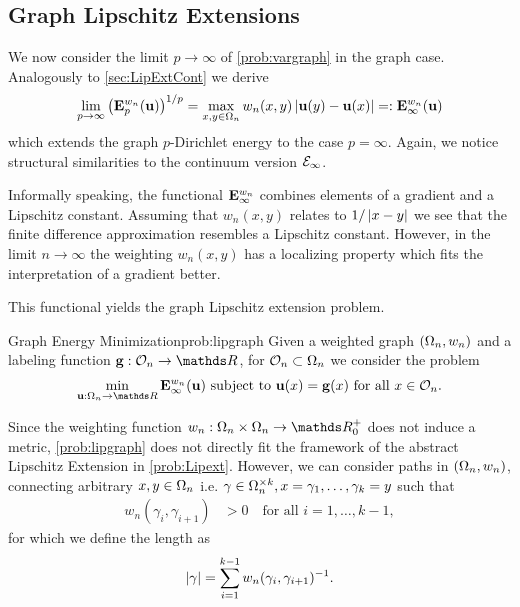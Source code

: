 \subsection{Graph Lipschitz Extensions}\label{sec:GLipExt}
%
We now consider the limit $p\to\infty$ of \cref{prob:vargraph} in the graph case. Analogously to \cref{sec:LipExtCont} we derive
%
\begin{align*}
\lim_{p\to\infty} \left(\mathbf{E}^{w_n}_p(\mathbf{u})\right)^{1/p}= \max_{x,y\in\Omega_n} w_n(x,y) \left|\mathbf{u}(y) - \mathbf{u}(x)\right|=:\mathbf{E}^{w_n}_\infty(\mathbf{u})
\end{align*}
%
which extends the graph $p$-Dirichlet energy to the case $p=\infty$. Again, we notice structural similarities to 
the continuum version $\mathcal{E}_\infty$. 
%
\begin{remark}{}{}
Informally speaking, the functional $\mathbf{E}^{w_n}_\infty$ combines elements of a gradient and a Lipschitz constant. Assuming that $w_n(x,y)$ relates to $1/\left|x-y\right|$ we see that the finite difference approximation
resembles a Lipschitz constant. However, in the limit $n\to\infty$ the weighting $w_n(x,y)$ has a localizing property which fits the interpretation of a gradient better.
\end{remark}
%
\noindent%
This functional yields the graph Lipschitz extension problem.
%
\begin{problem}{Graph Energy Minimization}{prob:lipgraph}
Given a weighted graph $(\Omega_n, w_n)$ and a labeling function $\vec g:\conset_n\to\R$, for $\mathcal{O}_n\subset\Omega_n$ we consider 
the problem
%
\begin{align*}
\min_{\vec u:\domain_n\to\R} \GE_\infty^{w_n}(\vec u) \text{ subject to } \vec u(x) = \vec g(x) \text{ for all } x\in\conset_n.
\end{align*}
\end{problem}
%
\noindent%
Since the weighting function $w_n:\domain_n\times\domain_n\to\R^+_0$ does not induce a metric, \cref{prob:lipgraph} does not directly fit the framework of the abstract Lipschitz Extension in \cref{prob:Lipext}. However, we can consider paths in $(\Omega_n, w_n)$, connecting arbitrary $x,y\in\Omega_n$ i.e. $\gamma\in\Omega_n^{\times k}, x=\gamma_1,\ldots, \gamma_k = y$ such that 
%
\begin{align*}
w_n(\gamma_i, \gamma_{i+1}) &> 0\quad\text{for all } i=1,\ldots, k-1,
\end{align*}
%
for which we define the length as
%
\begin{align*}
\left|\gamma\right| = \sum_{i=1}^{k-1} w_n(\gamma_i, \gamma_{i+1})^{-1}.
\end{align*}
